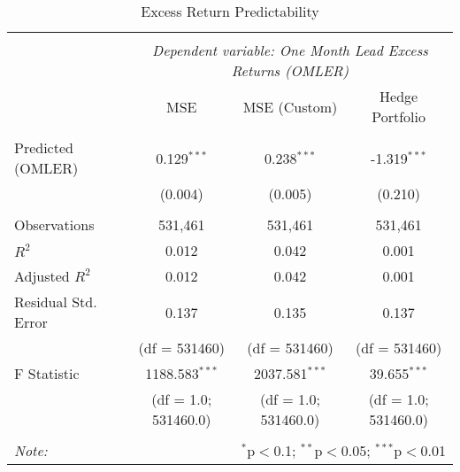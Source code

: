 \begin{table}[!htbp] \centering
\begin{tabular}{@{\extracolsep{5pt}}lccc}
\\[-1.8ex]\hline
\hline \\[-1.8ex]
& \multicolumn{3}{c}{\textit{Dependent variable: One Month Lead Excess Returns (OMLER)}} \
\cr \cline{3-4}
\\[-1.8ex] &  MSE & MSE (Custom) & Hedge Portfolio \\
\hline \\[-1.8ex]
 Predicted (OMLER)  & 0.129$^{***}$ & 0.238$^{***}$ & -1.319$^{***}$ \\
  & (0.004) & (0.005) & (0.210) \\
\hline \\[-1.8ex]
 Observations & 531,461 & 531,461 & 531,461 \\
 $R^2$ & 0.012 & 0.042 & 0.001 \\
 Adjusted $R^2$ & 0.012 & 0.042 & 0.001 \\
 Residual Std. Error & 0.137 & 0.135 & 0.137  \\
                      &(df = 531460)&(df = 531460)&(df = 531460)\\
 F Statistic & 1188.583$^{***}$  & 2037.581$^{***}$ & 39.655$^{***}$ \\
            &(df = 1.0; 531460.0)&(df = 1.0; 531460.0)&(df = 1.0; 531460.0)\\
\hline
\hline \\[-1.8ex]
\textit{Note:} & \multicolumn{3}{r}{$^{*}$p$<$0.1; $^{**}$p$<$0.05; $^{***}$p$<$0.01} \\
\end{tabular}
\caption{Excess Return Predictability}
\label{predicability-actual-returns}
\end{table}
